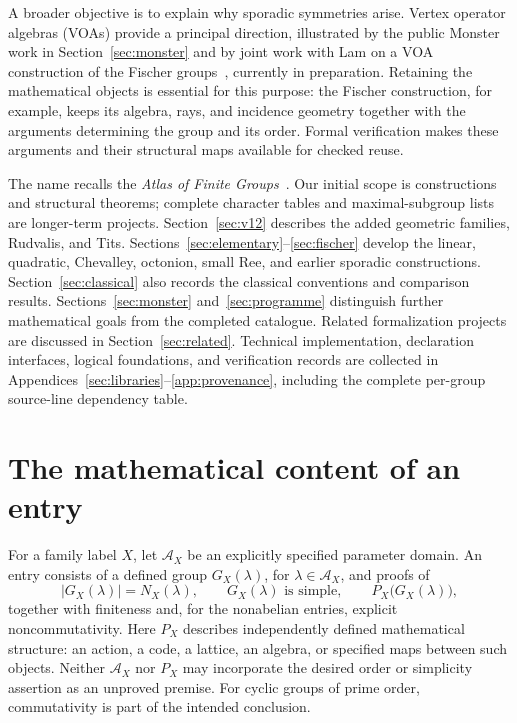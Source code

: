 \documentclass[11pt]{article}
\numberwithin{equation}{section}
\theoremstyle{definition}
\begin{document}
A broader objective is to explain why sporadic symmetries arise.
Vertex operator algebras (VOAs) provide a principal direction,
illustrated by the public Monster work in Section~\ref{sec:monster}
and by joint work with Lam on a VOA construction of the Fischer
groups~\cite{FischerVOA}, currently in preparation.
Retaining the mathematical objects is essential for this purpose:
the Fischer construction, for example, keeps its algebra, rays, and
incidence geometry together with the arguments determining the group
and its order. Formal verification makes these arguments and their
structural maps available for checked reuse.

The name recalls the \emph{Atlas of Finite Groups}~\cite{ATLAS85}.
Our initial scope is constructions and structural theorems; complete
character tables and maximal-subgroup lists are longer-term projects.
Section~\ref{sec:v12} describes the added geometric families, Rudvalis,
and Tits. Sections~\ref{sec:elementary}--\ref{sec:fischer} develop the
linear, quadratic, Chevalley, octonion, small Ree, and earlier sporadic
constructions.
Section~\ref{sec:classical} also records the classical conventions
and comparison results. Sections~\ref{sec:monster}
and~\ref{sec:programme} distinguish further mathematical goals from
the completed catalogue. Related formalization projects are discussed
in Section~\ref{sec:related}. Technical implementation, declaration
interfaces, logical foundations, and verification records are collected
in Appendices~\ref{sec:libraries}--\ref{app:provenance}, including the
complete per-group source-line dependency table.

\section{The mathematical content of an entry}\label{sec:contract}

For a family label $X$, let $\mathcal A_X$ be an explicitly specified
parameter domain. An entry consists of a defined group $G_X(\lambda)$,
for $\lambda\in\mathcal A_X$, and proofs of
\begin{equation}\label{eq:entry}
 \lvert G_X(\lambda)\rvert=N_X(\lambda),\qquad
 G_X(\lambda)\text{ is simple},\qquad
 P_X\bigl(G_X(\lambda)\bigr),
\end{equation}
together with finiteness and, for the nonabelian entries, explicit
noncommutativity. Here $P_X$ describes independently defined mathematical
structure: an action, a code, a lattice, an algebra, or specified maps
between such objects. Neither $\mathcal A_X$ nor $P_X$ may incorporate the
desired order or simplicity assertion as an unproved premise. For cyclic
groups of prime order, commutativity is part of the intended conclusion.
\end{document}
